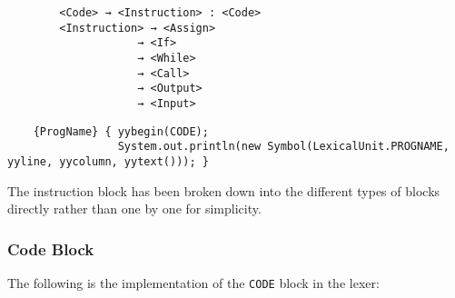     \begin{verbatim}
		<Code> → <Instruction> : <Code>
		<Instruction> → <Assign>
					→ <If>
					→ <While>
					→ <Call>
					→ <Output>
					→ <Input>
	\end{verbatim}
    \begin{table}[h]
		\centering
		\caption{ProgName and transition to the CODE block}
	\end{table}

    \begin{verbatim}
	{ProgName} { yybegin(CODE);
				 System.out.println(new Symbol(LexicalUnit.PROGNAME, yyline, yycolumn, yytext())); }
	\end{verbatim}

    \begin{table}[h]
		\centering
		\caption{ProgName and transition to the CODE block}
	\end{table}

	The instruction block has been broken down into the different types of blocks directly rather than one by one for simplicity.\\

	\subsubsection{Code Block}

	The following is the implementation of the \texttt{CODE} block in the lexer:

